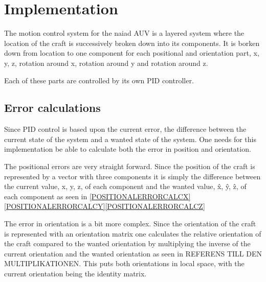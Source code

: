 \section{Implementation}\label{sec:implementation}

The motion control system for the naiad AUV is a layered system where the location of the craft is successively broken down into its components. It is borken down from location to one component for each positional and orientation part, x, y, z, rotation around x, rotation around y and rotation around z. 

Each of these parts are controlled by its own PID controller.

\subsection{Error calculations}
Since PID control is based upon the current error, the difference between the current state of the system and a wanted state of the system. One needs for this implementation be able to calculate both the error in position and orientation.

The positional errors are very straight forward. Since the position of the craft is represented by a vector with three components it is simply the difference between the current value, x, y, z, of each component and the wanted value, \^x, \^y, \^z, of each component as seen in \eqref{POSITIONALERRORCALCX}\eqref{POSITIONALERRORCALCY}\eqref{POSITIONALERRORCALCZ}


The error in orientation is a bit more complex. Since the orientation of the craft is represented with an orientation matrix one calculates the relative orientation of the craft compared to the wanted orientation by multiplying the inverse of the current orientation and the wanted orientation as seen in REFERENS TILL DEN MULTIPLIKATIONEN. This puts both orientations in local space, with the current orientation being the identity matrix.

